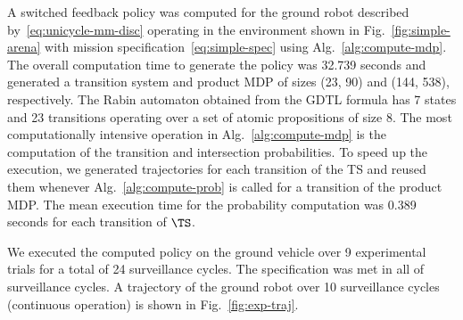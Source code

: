 A switched feedback policy was computed for the ground
robot described by~\eqref{eq:unicycle-mm-disc} operating
in the environment shown in Fig.~\ref{fig:simple-arena}
with mission specification~\eqref{eq:simple-spec} using
Alg.~\ref{alg:compute-mdp}.
The overall computation time to generate the policy was
32.739 seconds and generated a transition system and product
MDP of sizes (23, 90) and (144, 538), respectively.
The Rabin automaton obtained from the GDTL formula has
7 states and 23 transitions operating over a set of atomic
propositions of size 8.
The most computationally intensive operation in
Alg.~\ref{alg:compute-mdp} is the computation of the
transition and intersection probabilities.
To speed up the execution, we generated trajectories for
each transition of the TS and reused them whenever
Alg.~\ref{alg:compute-prob} is called for a transition
of the product MDP.
The mean execution time for the probability computation
was 0.389 seconds for each transition of $\TS$.

We executed the computed policy on the ground vehicle
over 9 experimental trials for a total of 24 surveillance cycles.
The specification was met in all of surveillance cycles.
A trajectory of the ground robot over 10 surveillance cycles
(continuous operation) is shown in Fig.~\ref{fig:exp-traj}.
